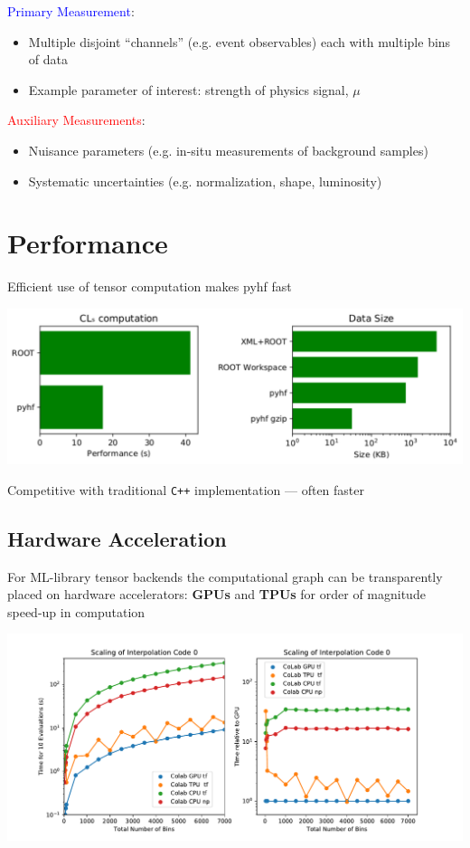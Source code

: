 \documentclass[a0paper,fleqn]{betterposter}
\begin{document}
{ \textcolor{blue}{Primary Measurement}:
 \begin{itemize}
  \item Multiple disjoint ``channels'' (e.g.\!\!\!\! event observables) each with multiple bins of data
  \item Example parameter of interest: strength of physics signal, $\mu$
 \end{itemize}
 \textcolor{red}{Auxiliary Measurements}:
 \begin{itemize}
  \item Nuisance parameters (e.g.\!\!\!\! in-situ measurements of background samples)
  \item Systematic uncertainties (e.g. normalization, shape, luminosity)
 \end{itemize}

 \vfill
 \section{Performance}
 Efficient use of tensor computation makes pyhf fast
 \begin{center}
  \includegraphics[width=\textwidth]{performance_only.pdf}
 \end{center}
 Competitive with traditional \texttt{C++} implementation --- often faster
 \vfill
 \subsection{Hardware Acceleration}
 For ML-library tensor backends the computational graph can be transparently placed on hardware accelerators: \textbf{GPUs} and \textbf{TPUs} for order of magnitude speed-up in computation
 \begin{center}
  \includegraphics[width=\textwidth]{scaling_hardware.pdf}
 \end{center}
}{

}
\end{document}
